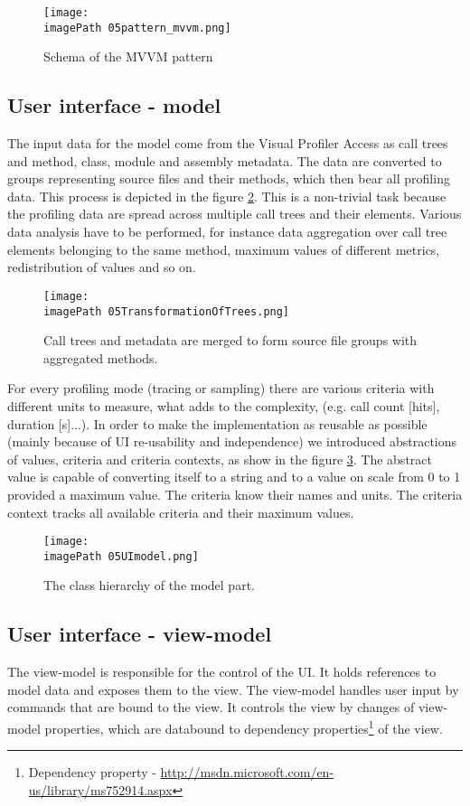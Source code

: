 \begin{figure}
	\centering
		\texttt{[image: \\imagePath 05pattern\_mvvm.png]}
		\caption{Schema of the MVVM pattern \cite{WPFpage}}
	\label{fig:05pattern_mvvm}
\end{figure}

\subsection{User interface - model}
The input data for the model come from the Visual Profiler Access as call trees and method, class, module and assembly metadata. The data are converted to groups representing source files and their methods, which then bear all profiling data. This process is depicted in the figure \ref{fig:05TransformationOfTrees}. This is a non-trivial task because the profiling data are spread across multiple call trees and their elements. Various data analysis have to be performed, for instance data aggregation over call tree elements belonging to the same method, maximum values of different metrics, redistribution of values and so on.

 \begin{figure}
	\centering
		\texttt{[image: \\imagePath 05TransformationOfTrees.png]}
		\caption{Call trees and metadata are merged to form source file groups with aggregated methods.}
	\label{fig:05TransformationOfTrees}
\end{figure}

For every profiling mode (tracing or sampling) there are various criteria with different units to measure, what adds to the complexity, (e.g. call count [hits], duration [s]...). In order to make the implementation as reusable as possible (mainly because of UI re-usability and independence) we introduced abstractions of values, criteria and criteria contexts, as show in the figure \ref{fig:05UImodel}. The abstract value is capable of converting itself to a string and to a value on scale from 0 to 1 provided a maximum value. The criteria know their names and units. The criteria context tracks all available criteria and their maximum values. 

 \begin{figure}
	\centering
		\texttt{[image: \\imagePath 05UImodel.png]}
		\caption{The class hierarchy of the model part.}
	\label{fig:05UImodel}
\end{figure}

\subsection{User interface - view-model}
The view-model is responsible for the control of the UI. It holds references to model data and exposes them to the view. The view-model handles user input by commands that are bound to the view. It controls the view by changes of view-model properties, which are databound to dependency properties\footnote{Dependency property - \href{http://msdn.microsoft.com/en-us/library/ms752914.aspx}{http://msdn.microsoft.com/en-us/library/ms752914.aspx}} of the view.

